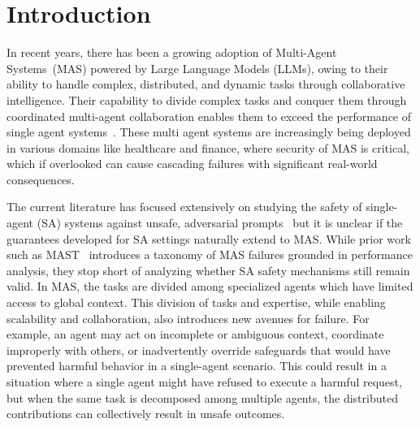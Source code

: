 \section{Introduction}


In recent years, there has been a growing adoption of {M}ulti-{A}gent {S}ystems~({MAS}) powered by Large Language Models (LLMs), owing to their ability to handle complex, distributed, and dynamic tasks through collaborative intelligence. Their capability to divide complex tasks and conquer them through coordinated multi-agent collaboration enables them to exceed the performance of single agent systems~\citep{Hadfield_2025}. These multi agent systems are increasingly being deployed in various domains like healthcare and finance, where security of MAS is critical, which if overlooked can cause cascading failures with significant real-world consequences. 


The current literature has focused extensively on studying the safety of single-agent (SA) systems against unsafe, adversarial prompts~\citep{andriushchenko2024agentharm, guo2024redcode, zhang2024agent, tur2025safearena} but it is unclear if the guarantees developed for SA settings naturally extend to MAS. While prior work such as MAST~\citep{cemri2025multiagentllmsystemsfail} introduces a taxonomy of MAS failures grounded in performance analysis, they stop short of analyzing whether SA safety mechanisms still remain valid. In MAS, the tasks are divided among specialized agents which have limited access to global context. This division of tasks and expertise, while enabling scalability and collaboration, also introduces new avenues for failure. For example, an agent may act on incomplete or ambiguous context, coordinate improperly with others, or inadvertently override safeguards that would have prevented harmful behavior in a single-agent scenario. This could result in a situation where a single agent might have refused to execute a harmful request, but when the same task is decomposed among multiple agents, the distributed contributions can collectively result in unsafe outcomes.

